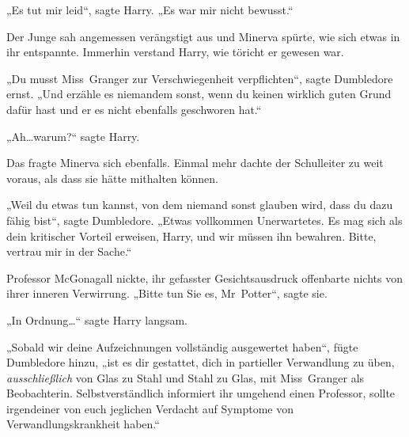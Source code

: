„Es tut mir leid“, sagte Harry. „Es war mir nicht bewusst.“

Der Junge sah angemessen verängstigt aus und Minerva spürte, wie sich etwas in ihr entspannte. Immerhin verstand Harry, wie töricht er gewesen war.

„Du musst Miss~Granger zur Verschwiegenheit verpflichten“, sagte Dumbledore ernst. „Und erzähle es niemandem sonst, wenn du keinen wirklich guten Grund dafür hast und er es nicht ebenfalls geschworen hat.“

„Ah…warum?“ sagte Harry.

Das fragte Minerva sich ebenfalls. Einmal mehr dachte der Schulleiter zu weit voraus, als dass sie hätte mithalten können.

„Weil du etwas tun kannst, von dem niemand sonst glauben wird, dass du dazu fähig bist“, sagte Dumbledore. „Etwas vollkommen Unerwartetes. Es mag sich als dein kritischer Vorteil erweisen, Harry, und wir müssen ihn bewahren. Bitte, vertrau mir in der Sache.“

Professor McGonagall nickte, ihr gefasster Gesichtsausdruck offenbarte nichts von ihrer inneren Verwirrung. „Bitte tun Sie es, Mr~Potter“, sagte sie.

„In Ordnung…“ sagte Harry langsam.

„Sobald wir deine Aufzeichnungen vollständig ausgewertet haben“, fügte Dumbledore hinzu, „ist es dir gestattet, dich in partieller Verwandlung zu üben, \emph{ausschließlich} von Glas zu Stahl und Stahl zu Glas, mit Miss~Granger als Beobachterin. Selbstverständlich informiert ihr umgehend einen Professor, sollte irgendeiner von euch jeglichen Verdacht auf Symptome von Verwandlungskrankheit haben.“

